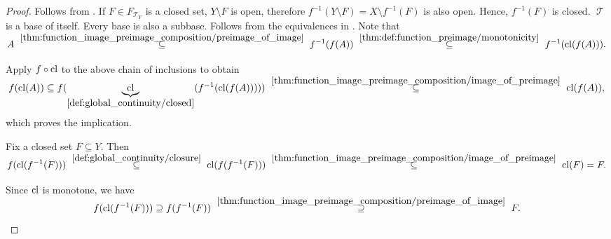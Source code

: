 \begin{proof}
   Follows from .
   If \( F \in F_{\mscrT_Y} \) is a closed set, \( Y \setminus F \) is open, therefore \( f^{-1}(Y \setminus F) = X \setminus f^{-1}(F) \) is also open. Hence, \( f^{-1}(F) \) is closed.
   \( \mscrT \) is a base of itself.
   Every base is also a subbase.
   Follows from the equivalences in .
   Note that
  \begin{equation*}
    A
    \reloset {\ref{thm:function_image_preimage_composition/preimage_of_image}} \subseteq
    f^{-1}(f(A))
    \reloset {\ref{thm:def:function_preimage/monotonicity}} \subseteq
    f^{-1}(\cl(f(A))).
  \end{equation*}

  Apply \( f \circ \operatorname{cl} \) to the above chain of inclusions to obtain
  \begin{equation*}
    f(\cl(A))
    \subseteq
    f(\underbrace{\cl}_{\ref{def:global_continuity/closed}}(f^{-1}(\cl(f(A)))))
    \reloset {\ref{thm:function_image_preimage_composition/image_of_preimage}} \subseteq
    \cl(f(A)),
  \end{equation*}
  which proves the implication.

   Fix a closed set \( F \subseteq Y \). Then
  \begin{equation}\label{def:global_continuity/closure_implies_closed_right}
    f(\cl(f^{-1}(F)))
    \reloset {\ref{def:global_continuity/closure}} \subseteq
    \cl(f(f^{-1}(F)))
    \reloset {\ref{thm:function_image_preimage_composition/image_of_preimage}} \subseteq
    \cl(F)
    =
    F.
  \end{equation}

  Since \( \operatorname{cl} \) is monotone, we have
  \begin{equation}\label{def:global_continuity/closure_implies_closed_left}
    f(\cl(f^{-1}(F)))
    \supseteq
    f(f^{-1}(F))
    \reloset {\ref{thm:function_image_preimage_composition/preimage_of_image}} \supseteq
    F.
  \end{equation}


\end{proof}
